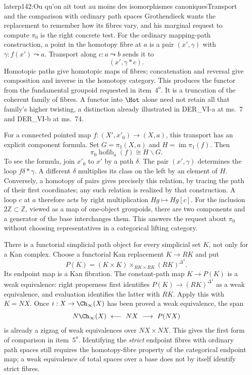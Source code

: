 \begin{dcomment}{later}{p142:Ou qu'on ait tout au moins des isomorphismes canoniques}{Transport and the comparison with ordinary path spaces}
Grothendieck wants the replacement to remember how its fibres vary, and his marginal request to compute $\pi_0$ is the right concrete test. For the ordinary mapping-path construction, a point in the homotopy fibre at $a$ is a pair $(x',\gamma)$ with $\gamma:f(x')\leadsto a$. Transport along $c:a\leadsto b$ sends it to
\[
                       (x',\gamma*c).
\]
Homotopic paths give homotopic maps of fibres; concatenation and reversal give composition and inverse in the homotopy category. This produces the functor from the fundamental groupoid requested in item~$4^o$. It is a truncation of the coherent family of fibres. A functor into $\Hot$ alone need not retain all that family's higher twisting, a distinction already illustrated in DER\_VI-a at ms.~7 and DER\_VI-b at ms.~74.

For a connected pointed map $f:(X',x'_0)\to(X,a)$, this transport has an explicit component formula. Set $G=\pi_1(X,a)$ and $H=\operatorname{im}\pi_1(f)$. Then
\[
                   \pi_0\operatorname{hofib}_a(f)\cong H\backslash G.
\]
To see the formula, join $x'_0$ to $x'$ by a path $\delta$. The pair $(x',\gamma)$ determines the loop $f\delta*\gamma$. A different $\delta$ multiplies its class on the left by an element of $H$. Conversely, a homotopy of pairs gives precisely this relation, by tracing the path of their first coordinates; any such relation is realized by that construction. A loop $c$ at $a$ therefore acts by right multiplication $Hg\mapsto Hg[c]$. For the inclusion $2\mathbb Z\subset\mathbb Z$, viewed as a map of one-object groupoids, there are two components and a generator of the base interchanges them. This answers the request about $\pi_0$ without choosing representatives in a categorical lifting category.

There is a functorial simplicial path object for every simplicial set $K$, not only for a Kan complex. Choose a functorial Kan replacement $K\to RK$ and put
\[
 P(K)=(K\times K)\times_{RK\times RK}(RK)^{\Delta^1}.
\]
Its endpoint map is a Kan fibration. The constant-path map $K\to P(K)$ is a weak equivalence: right properness first identifies $P(K)\to(RK)^{\Delta^1}$ as a weak equivalence, and evaluation identifies the latter with $RK$. Apply this with $K=NX$. Once $i:X\to\Ch_\infty(X)$ has been proved a weak equivalence, the span
\[
             N\Ch_\infty(X)\ \longleftarrow\ NX
                              \ \longrightarrow\ P(NX)
\]
is already a zigzag of weak equivalences over $NX\times NX$. This gives the first form of comparison in item~$5^o$. Identifying the \emph{strict} endpoint fibres with ordinary path spaces still requires the homotopy-fibre property of the categorical endpoint map; a weak equivalence of total spaces over a base does not by itself identify strict fibres.


\end{dcomment}
